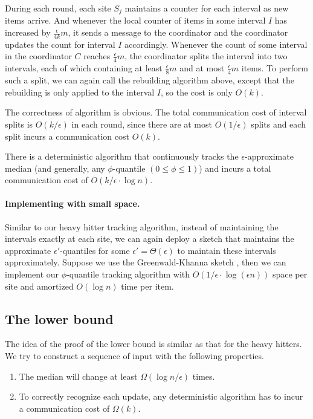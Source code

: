 \documentclass[10pt]{article}
\newcommand{\eps}{\epsilon}
\begin{document}
During each round, each site $S_j$ maintains a counter for each interval as
new items arrive. And whenever the local counter of items in some interval
$I$ has increased by $\frac{\eps}{4k}m$, it sends a message to
the coordinator and the coordinator updates the count for interval $I$
accordingly.  Whenever the count of some interval in the coordinator $C$
reaches $\frac{\eps}{4} m$, the coordinator splits the interval into two
intervals, each of which containing at least $\frac{\eps}{8}m$ and at most
$\frac{\eps}{4}m$ items.  To perform such a split, we can again call the
rebuilding algorithm above, except that the rebuilding is only applied to
the interval $I$, so the cost is only $O(k)$.

The correctness of algorithm is obvious. The total communication
cost of interval splits is $O({k}/{\eps})$ in each round, since
there are at most $O(1/\eps)$ splits and each split incurs a
communication cost $O(k)$.

\begin{theorem}
  There is a deterministic algorithm that continuously tracks the
  $\eps$-approximate median (and generally, any $\phi$-quantile $(0 \le
  \phi \le 1)$) and incurs a total communication cost of $O(k/\eps\cdot
  \log n)$.
\end{theorem}

\paragraph{Implementing with small space.}
Similar to our heavy hitter tracking algorithm, instead of maintaining the
intervals exactly at each site, we can again deploy a sketch that maintains
the approximate $\eps'$-quantiles for some $\eps'=\Theta(\eps)$ to maintain
these intervals approximately.  Suppose we use the Greenwald-Khanna sketch
\cite{greenwald01:_space}, then we can implement our $\phi$-quantile
tracking algorithm with $O(1/\eps\cdot \log(\eps n))$ space per site and
amortized $O(\log n)$ time per item.

\subsection{The lower bound}


The idea of the proof of the lower bound is similar as that for
the heavy hitters. We try to construct a sequence of input with
the following properties.
\begin{enumerate}
\item The median will change at least $\Omega(\log n/\eps)$ times.

\item To correctly recognize each update, any deterministic
algorithm has to incur a communication cost of $\Omega(k)$.
\end{enumerate}
\end{document}
